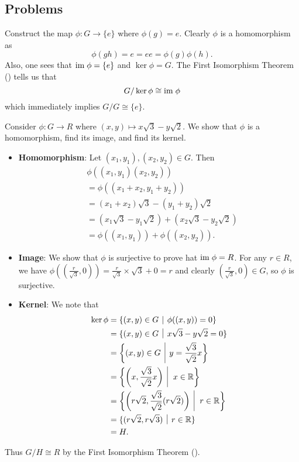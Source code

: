 \subsection*{Problems}
\begin{questions}
    \item Construct the map $\phi: G \to \{e\}$ where $\phi(g) = e$. Clearly $\phi$ is a homomorphism as
    \[
        \phi(gh) = e = ee = \phi(g)\phi(h).
    \]
    Also, one sees that $\mathrm{im}\;\phi = \{e\}$ and $\ker\phi = G$. The First Isomorphism Theorem () tells us that
    \[
        G / \ker\phi \cong \mathrm{im}\;\phi
    \]
    which immediately implies $G/G \cong \{e\}$.

    \item Consider $\phi: G \to R$ where $(x, y) \mapsto x\sqrt3 - y\sqrt2$. We show that $\phi$ is a homomorphism, find its image, and find its kernel.
    \begin{itemize}
        \item \textbf{Homomorphism}: Let $(x_1, y_1), (x_2, y_2) \in G$. Then
        \begin{align*}
            &\phi((x_1,y_1)(x_2,y_2))\\
            &= \phi((x_1+x_2,y_1+y_2))\\
            &= (x_1+x_2)\sqrt3 - (y_1+y_2)\sqrt2\\
            &= (x_1\sqrt3 - y_1\sqrt2) + (x_2\sqrt3 - y_2\sqrt2)\\
            &= \phi((x_1, y_1)) + \phi((x_2, y_2)).
        \end{align*}

        \item \textbf{Image}: We show that $\phi$ is surjective to prove hat $\mathrm{im}\;\phi = R$. For any $r \in R$, we have $\phi\left(\left(\frac{r}{\sqrt3}, 0\right)\right) = \frac{r}{\sqrt3} \times \sqrt3 + 0 = r$ and clearly $\left(\frac{r}{\sqrt3}, 0\right) \in G$, so $\phi$ is surjective.

        \item \textbf{Kernel}: We note that
        \begin{align*}
            \ker\phi &= \{(x, y) \in G \vert \phi((x, y)) = 0\}\\
            &= \{(x, y) \in G \vert x\sqrt3-y\sqrt2 = 0\}\\
            &= \left\{(x, y) \in G \vert y = \frac{\sqrt{3}}{\sqrt{2}}x\right\}\\
            &= \left\{\left(x, \frac{\sqrt{3}}{\sqrt{2}}x\right) \vert x \in \R\right\}\\
            &= \left\{\left(r\sqrt2, \frac{\sqrt{3}}{\sqrt{2}}(r\sqrt2)\right) \vert r \in \R\right\}\\
            &= \{(r\sqrt2, r\sqrt3) \vert r \in \R\}\\
            &= H.
        \end{align*}
    \end{itemize}
    Thus $G / H \cong R$ by the First Isomorphism Theorem ().


\end{questions}
